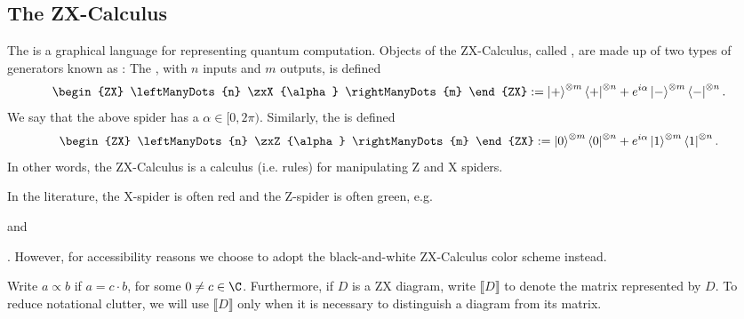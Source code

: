 \subsection{The ZX-Calculus}

\begin{definition}
The  is a graphical language for representing quantum computation. Objects of the ZX-Calculus, called , are made up of two types of generators known as : The , with $n$ inputs and $m$ outputs, is defined
\begin{align}
    \begin{ZX}
        \leftManyDots{n} \zxX{\alpha} \rightManyDots{m}
    \end{ZX}
    :=
    \ket{+}^{\otimes m} \bra{+}^{\otimes n} + e^{i \alpha} \ket{-}^{\otimes m} \bra{-}^{\otimes n}.
\end{align}
We say that the above spider has a  $\alpha \in [0,2\pi)$. Similarly, the  is defined
\begin{align}
    \begin{ZX}
        \leftManyDots{n} \zxZ{\alpha} \rightManyDots{m}
    \end{ZX}
    := 
    \ket{0}^{\otimes m} \bra{0}^{\otimes n} + e^{i \alpha} \ket{1}^{\otimes m} \bra{1}^{\otimes n}.
\end{align}
In other words, the ZX-Calculus is a calculus (i.e. rules) for manipulating Z and X spiders.
\end{definition}

\begin{remark}
In the literature, the X-spider is often red and the Z-spider is often green, e.g. \begin{ZX}\zxX[fill=red!70]{}\end{ZX} and \begin{ZX}\zxZ[fill=green!60!black]{}\end{ZX}. However, for accessibility reasons we choose to adopt the black-and-white ZX-Calculus color scheme instead.
\end{remark}

\begin{definition}
Write $a \propto b$ if $a = c \cdot b$, for some $0 \neq c \in \C$. Furthermore, if $D$ is a ZX diagram, write $\llbracket D \rrbracket$ to denote the matrix represented by $D$. To reduce notational clutter, we will use $\llbracket D \rrbracket$ only when it is necessary to distinguish a diagram from its matrix.
\end{definition}

